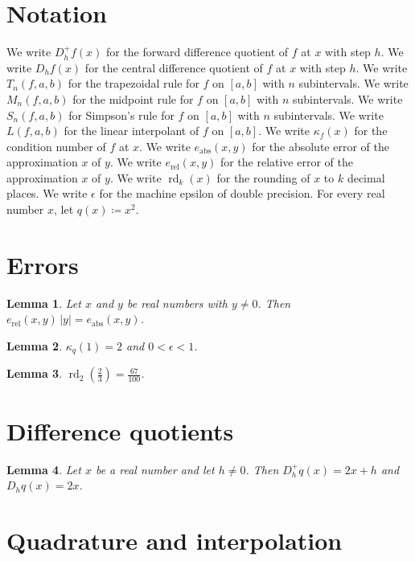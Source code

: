\documentclass{article}
\newtheorem{lemma}{Lemma}
\begin{document}
\section{Notation}

We write $D_h^+f(x)$ for the forward difference quotient of $f$ at $x$ with step $h$.
We write $D_hf(x)$ for the central difference quotient of $f$ at $x$ with step $h$.
We write $T_n(f,a,b)$ for the trapezoidal rule for $f$ on $[a,b]$ with $n$ subintervals.
We write $M_n(f,a,b)$ for the midpoint rule for $f$ on $[a,b]$ with $n$ subintervals.
We write $S_n(f,a,b)$ for Simpson's rule for $f$ on $[a,b]$ with $n$ subintervals.
We write $L(f,a,b)$ for the linear interpolant of $f$ on $[a,b]$.
We write $\kappa_f(x)$ for the condition number of $f$ at $x$.
We write $e_{\mathrm{abs}}(x,y)$ for the absolute error of the approximation $x$ of $y$.
We write $e_{\mathrm{rel}}(x,y)$ for the relative error of the approximation $x$ of $y$.
We write $\operatorname{rd}_k(x)$ for the rounding of $x$ to $k$ decimal places.
We write $\epsilon$ for the machine epsilon of double precision.
For every real number $x$, let $q(x)\coloneqq x^2$.

\section{Errors}

\begin{lemma}\label{error}
Let $x$ and $y$ be real numbers with $y\ne0$. Then $e_{\mathrm{rel}}(x,y)\,|y|=e_{\mathrm{abs}}(x,y)$.
\end{lemma}

\begin{lemma}\label{condition}
$\kappa_q(1)=2$ and $0<\epsilon<1$.
\end{lemma}

\begin{lemma}\label{rounding}
$\operatorname{rd}_2(\frac{2}{3})=\frac{67}{100}$.
\end{lemma}

\section{Difference quotients}

\begin{lemma}\label{forward}
Let $x$ be a real number and let $h\ne0$. Then $D_h^+q(x)=2x+h$ and $D_hq(x)=2x$.
\end{lemma}

\section{Quadrature and interpolation}
\end{document}
